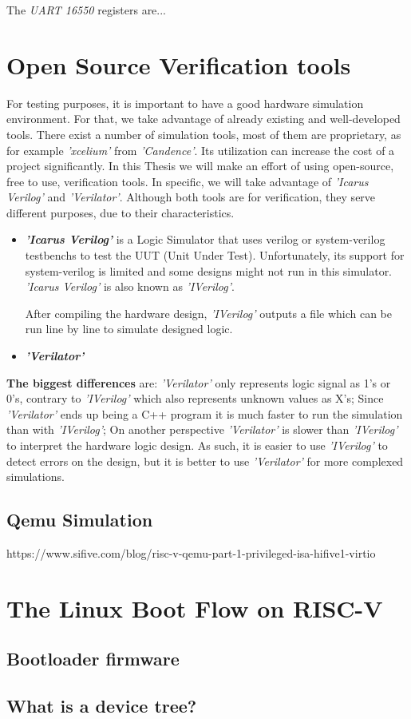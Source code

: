 The \textit{UART 16550} registers are...

\section{Open Source Verification tools}
\label{section:verification_tools}
For testing purposes, it is important to have a good hardware simulation environment. For that, we take advantage of already existing and well-developed tools. There exist a number of simulation tools, most of them are proprietary, as for example \textit{'xcelium'} from \textit{'Candence'}. Its utilization can increase the cost of a project significantly. In this Thesis we will make an effort of using open-source, free to use, verification tools. In specific, we will take advantage of \textit{'Icarus Verilog'} and \textit{'Verilator'}. Although both tools are for verification, they serve different purposes, due to their characteristics.

\begin{itemize}
    \item \textbf{\textit{'Icarus Verilog'}} is a Logic Simulator that uses verilog or system-verilog testbenchs to test the UUT (Unit Under Test). Unfortunately, its support for system-verilog is limited and some designs might not run in this simulator. \textit{'Icarus Verilog'} is also known as \textit{'IVerilog'}.
    
    After compiling the hardware design, \textit{'IVerilog'} outputs a file which can be run line by line to simulate designed logic.
    
    \item \textbf{\textit{'Verilator'}}
\end{itemize}

\textbf{The biggest differences} are: \textit{'Verilator'} only represents logic signal as 1's or 0's, contrary to \textit{'IVerilog'} which also represents unknown values as X's; Since \textit{'Verilator'} ends up being a C++ program it is much faster to run the simulation than with \textit{'IVerilog'}; On another perspective \textit{'Verilator'} is slower than \textit{'IVerilog'} to interpret the hardware logic design.
As such, it is easier to use \textit{'IVerilog'} to detect errors on the design, but it is better to use \textit{'Verilator'} for more complexed simulations.

\subsection{Qemu Simulation}
https://www.sifive.com/blog/risc-v-qemu-part-1-privileged-isa-hifive1-virtio

\section{The Linux Boot Flow on RISC-V}
\label{section:linux_boot_flow}
\subsection{Bootloader firmware}
\subsection{What is a device tree?}


